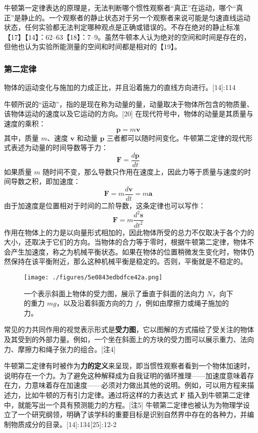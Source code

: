 牛顿第一定律表达的原理是，无法判断哪个惯性观察者“真正”在运动，哪个“真正”是静止的。一个观察者的静止状态对于另一个观察者来说可能是匀速直线运动状态，任何实验都无法判定哪种观点是正确或错误的。不存在绝对的静止标准【17】【14】：62–63【18】：7–9。虽然牛顿本人认为绝对的空间和时间是存在的，但他也认为实验所能测量的空间和时间都是相对的【19】。
\subsubsection{第二定律}
物体的运动变化与施加的力成正比，并且沿着施力的直线方向进行。[14]:114 
 
牛顿所说的“运动”，指的是现在称为动量的量，动量取决于物体所包含的物质量、该物体运动的速度以及它运动的方向。[20] 在现代符号中，物体的动量是其质量与速度的乘积：
\[
\mathbf{p} = m \mathbf{v}~
\]
其中，质量 \(m\)、速度 \( \mathbf{v} \) 和动量 \( \mathbf{p} \) 三者都可以随时间变化。牛顿第二定律的现代形式表述为动量的时间导数等于力：
\[
\mathbf{F} = \frac{d\mathbf{p}}{dt}~
\]
如果质量 \(m\) 随时间不变，那么导数只作用在速度上，因此力等于质量与速度的时间导数之积，即加速度：
\[
\mathbf{F} = m \frac{d\mathbf{v}}{dt} = m \mathbf{a}~
\]
由于加速度是位置相对于时间的二阶导数，这条定律也可以写作：
\[
\mathbf{F} = m \frac{d^2 \mathbf{s}}{dt^2}~
\]
作用在物体上的力是以向量形式相加的，因此物体所受的总力不仅取决于各个力的大小，还取决于它们的方向。当物体的合力等于零时，根据牛顿第二定律，物体不会产生加速度，称之为机械平衡状态。如果在物体的位置稍微发生变化时，物体仍然保持在该平衡附近，那么这种机械平衡是稳定的。否则，平衡就是不稳定的。
\begin{figure}[ht]
\centering
\texttt{[image: ./figures/5e0843edbdfce42a.png]}
\caption{一个表示斜面上物体的受力图，展示了垂直于斜面的法向力 \(N\)，向下的重力 \(mg\)，以及沿着斜面方向的力 \(f\)，例如由摩擦力或绳子施加的力。} \label{fig_NEW01_2}
\end{figure}
常见的力共同作用的视觉表示形式是\textbf{受力图}，它以图解的方式描绘了受关注的物体及其受到的外部力量。例如，一个坐在斜面上的方块的受力图可以展示重力、法向力、摩擦力和绳子张力的组合。[注4]

牛顿第二定律有时被作为\textbf{力的定义}来呈现，即当惯性观察者看到一个物体加速时，说明存在一个力。为了避免这种解释成为自我证明的循环推理——加速度意味着存在力，力意味着存在加速度——必须对力做出其他的说明。例如，可以用方程来描述力，比如牛顿的万有引力定律。通过将这样的力表达式 \( \mathbf{F} \) 插入到牛顿第二定律中，就能写出一个具有预测能力的方程。[注5] 牛顿第二定律也被认为为物理学设立了一个研究纲领，明确了该学科的重要目标是识别自然界中存在的各种力，并编制物质成分的目录。[14]: 134 [25]: 12-2

